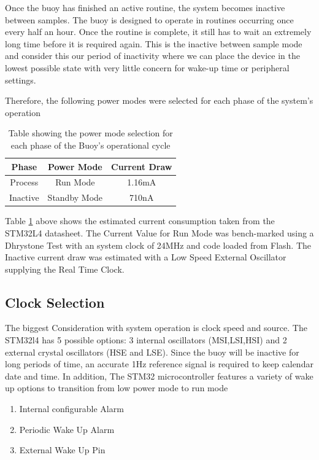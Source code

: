 Once the buoy has finished an active routine, the system becomes inactive between samples. The buoy is designed to operate in routines occurring once every half an hour. Once the routine is complete, it still has to wait an extremely long time before it is required again. This is the inactive between sample mode and consider this our period of inactivity where we can place the device in the lowest possible state with very little concern for wake-up time or peripheral settings. \par 
Therefore, the following power modes were selected for each phase of the system's operation

\begin{table}[H]
	\centering
	\caption{Table showing the power mode selection for each phase of the Buoy's operational cycle}
	\begin{tabular}{|c|c|c|}
		\hline 
		Phase &  Power Mode & Current Draw \\
		\hline
		Process & Run Mode & 1.16mA\\
		Inactive & Standby Mode & 710nA\\
		\hline
	\end{tabular}
	
	\label{tab:powmode_cycle}
\end{table}

Table \ref{tab:powmode_cycle} above shows the estimated current consumption taken from the STM32L4 datasheet. The Current Value for Run Mode was bench-marked using a Dhrystone Test with an system clock of 24MHz and code loaded from Flash. The Inactive current draw was estimated with a Low Speed External Oscillator supplying the Real Time Clock. 

\subsection{Clock Selection}

The biggest Consideration with system operation is clock speed and source. The STM32l4 has 5 possible options: 3 internal oscillators (MSI,LSI,HSI) and 2 external crystal oscillators (HSE and LSE). Since the buoy will be inactive for long periods of time, an accurate 1Hz reference signal is required to keep calendar date and time. In addition, The STM32 microcontroller features a variety of wake up options to transition from low power mode to run mode
\begin{enumerate}
	\item Internal  configurable Alarm
	\item Periodic Wake Up Alarm
	\item External Wake Up Pin
\end{enumerate}

